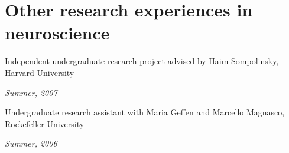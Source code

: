 \documentclass[letterpaper]{article}
\renewenvironment{itemize}{
  \begin{list}{}{
    \setlength{\leftmargin}{1.5em}
  }
}{
  \end{list}
}
\begin{document}
\section*{Other research experiences in neuroscience}

\begin{itemize}

\item Independent undergraduate research project advised by Haim Sompolinsky, Harvard University 

\textit{Summer, 2007}

\item Undergraduate research assistant with  Maria Geffen and Marcello Magnasco, Rockefeller University

\textit{Summer, 2006}

\end{itemize}


\bigskip
\end{document}

